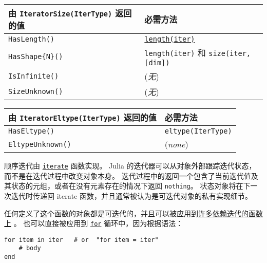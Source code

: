 \begin{table}[h]

\begin{tabulary}{\linewidth}{|L|L|}
\hline
由 \texttt{IteratorSize(IterType)} 返回的值 & 必需方法 \\
\hline
\texttt{HasLength()} & \hyperlink{3699181304419743826}{\texttt{length(iter)}} \\
\hline
\texttt{HasShape\{N\}()} & \texttt{length(iter)} 和 \texttt{size(iter, [dim])} \\
\hline
\texttt{IsInfinite()} & (\emph{无}) \\
\hline
\texttt{SizeUnknown()} & (\emph{无}) \\
\hline
\end{tabulary}

\end{table}




\begin{table}[h]

\begin{tabulary}{\linewidth}{|L|L|}
\hline
由 \texttt{IteratorEltype(IterType)} 返回的值 & 必需方法 \\
\hline
\texttt{HasEltype()} & \texttt{eltype(IterType)} \\
\hline
\texttt{EltypeUnknown()} & (\emph{none}) \\
\hline
\end{tabulary}

\end{table}



顺序迭代由 \hyperlink{1722534687975587846}{\texttt{iterate}} 函数实现。 Julia 的迭代器可以从对象外部跟踪迭代状态，而不是在迭代过程中改变对象本身。 迭代过程中的返回一个包含了当前迭代值及其状态的元组，或者在没有元素存在的情况下返回 \texttt{nothing}。 状态对象将在下一次迭代时传递回 iterate 函数，并且通常被认为是可迭代对象的私有实现细节。



任何定义了这个函数的对象都是可迭代的，并且可以被应用到\hyperlink{16454089156260356769}{许多依赖迭代的函数上} 。 也可以直接被应用到  \hyperlink{9105224580875818383}{\texttt{for}} 循环中，因为根据语法：




\begin{verbatim}
for item in iter   # or  "for item = iter"
    # body
end
\end{verbatim}



